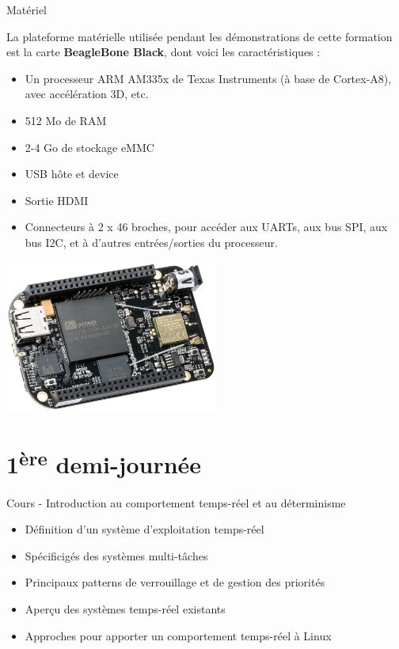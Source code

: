 \documentclass[a4paper,12pt,obeyspaces,spaces,hyphens]{article}
\begin{document}
\feagendatwocolumn
{Matériel}
{
  La plateforme matérielle utilisée pendant les démonstrations de
  cette formation est la carte {\bf BeagleBone Black}, dont voici les
  caractéristiques :

  \begin{itemize}
  \item Un processeur ARM AM335x de Texas Instruments (à base de
    Cortex-A8), avec accélération 3D, etc.
  \item 512 Mo de RAM
  \item 2-4 Go de stockage eMMC
  \item USB hôte et device
  \item Sortie HDMI
  \item Connecteurs à 2 x 46 broches, pour accéder aux UARTs, aux
        bus SPI, aux bus I2C, et à d'autres entrées/sorties du
        processeur.
  \end{itemize}
}
{}
{
  \begin{center}
    \includegraphics[height=5cm]{../slides/beagleboneblack-board/beagleboneblack.png}
  \end{center}
}

\section{1\textsuperscript{ère} demi-journée}

\feagendaonecolumn
{Cours - Introduction au comportement temps-réel et au déterminisme}
{
  \begin{itemize}
  \item Définition d'un système d'exploitation temps-réel
  \item Spécificigés des systèmes multi-tâches
  \item Principaux patterns de verrouillage et de gestion des priorités
  \item Aperçu des systèmes temps-réel existants
  \item Approches pour apporter un comportement temps-réel à Linux
  \end{itemize}
}
\end{document}
